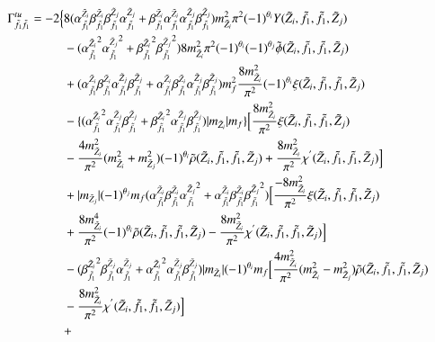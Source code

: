 \documentclass[final,3p,times,pdflatex]{elsarticle}
\begin{document}
\begin{equation}
\begin{aligned}
\Gamma_{\tilde{f}_1 \tilde{f}_1}^{tu} =  -2\Big\{&8({\alpha_{\tilde{f}_1}^{\tilde{Z}_i}}{\beta_{\tilde{f}_1}^{\tilde{Z}_i}}{\beta_{\tilde{f}_1}^{\tilde{Z}_j}}{\alpha_{\tilde{f}_1}^{\tilde{Z}_j}} + {\beta_{\tilde{f}_1}^{\tilde{Z}_i}}{\alpha_{\tilde{f}_1}^{\tilde{Z}_i}}{\alpha_{\tilde{f}_1}^{\tilde{Z}_j}} {\beta_{\tilde{f}_1}^{\tilde{Z}_j}}){m_{\tilde{Z}_i}^2 \pi^2}(-1)^{\theta_i}Y(\tilde{Z}_i,\tilde{f}_1, \tilde{f}_1, \tilde{Z}_j) \\ & -({\alpha_{\tilde{f}_1}^{\tilde{Z}_i}}^2 {\alpha_{\tilde{f}_1}^{\tilde{Z}_j}}^2 + {\beta_{\tilde{f}_1}^{\tilde{Z}_i}}^2 {\beta_{\tilde{f}_1}^{\tilde{Z}_j}}^2){8 m_{\tilde{Z}_i}^2 \pi^2} (-1)^{\theta_i}(-1)^{\theta_j} \tilde{\phi}(\tilde{Z}_i, \tilde{f}_1, \tilde{f}_1, \tilde{Z}_j) \\ & + ( {\alpha_{\tilde{f}_1}^{\tilde{Z}_i}}{\beta_{\tilde{f}_1}^{\tilde{Z}_i}}{\alpha_{\tilde{f}_1}^{\tilde{Z}_j}}{\beta_{\tilde{f}_1}^{\tilde{Z}_j}}+ {\alpha_{\tilde{f}_1}^{\tilde{Z}_i}}{\beta_{\tilde{f}_1}^{\tilde{Z}_i}} {\alpha_{\tilde{f}_1}^{\tilde{Z}_j}}{\beta_{\tilde{f}_1}^{\tilde{Z}_j}})m_{f}^2 {8 m_{\tilde{Z}_i}^2 \over \pi^2} (-1)^{\theta_i} \xi (\tilde{Z}_i,\tilde{f}_1, \tilde{f}_1, \tilde{Z}_j) \\ & -\{({\alpha_{\tilde{f}_1}^{\tilde{Z}_i}}^2 {\alpha_{\tilde{f}_1}^{\tilde{Z}_j}} {\beta_{\tilde{f}_1}^{\tilde{Z}_j}} + {\beta_{\tilde{f}_1}^{\tilde{Z}_i}}^2 {\alpha_{\tilde{f}_1}^{\tilde{Z}_j}} {\beta_{\tilde{f}_1}^{\tilde{Z}_j}})|m_{\tilde{Z}_i}|m_{f}\}\Big[{8 m_{\tilde{Z}_i}^2 \over \pi^2}\xi(\tilde{Z}_i, \tilde{f}_1, \tilde{f}_1, \tilde{Z}_j) \\ & - {4m_{\tilde{Z}_i}^2 \over \pi^2}(m_{\tilde{Z}_i}^2 + m_{\tilde{Z}_j}^2)(-1)^{\theta_i}\tilde{\rho}(\tilde{Z}_i,\tilde{f}_1,\tilde{f}_1,\tilde{Z}_j) + {8m_{\tilde{Z}_i}^2 \over \pi^2} \chi^{'} (\tilde{Z}_i,\tilde{f}_1,\tilde{f}_1,\tilde{Z}_j)\Big] \\ & + |m_{\tilde{Z}_j}|(-1)^{\theta_j}m_{f}({\alpha_{\tilde{f}_1}^{\tilde{Z}_i}}{\beta_{\tilde{f}_1}^{\tilde{Z}_i}}{\alpha_{\tilde{f}_1}^{\tilde{Z}_j}}^2 + {\alpha_{\tilde{f}_1}^{\tilde{Z}_i}} {\beta_{\tilde{f}_1}^{\tilde{Z}_i}}{\beta_{\tilde{f}_1}^{\tilde{Z}_j}}^2)\Big[{-8m_{\tilde{Z}_i}^2 \over \pi^2}\xi(\tilde{Z}_i,\tilde{f}_1,\tilde{f}_1,\tilde{Z}_j) \\ & + {8 m_{\tilde{Z}_i}^4 \over \pi^2}(-1)^{\theta_i}\tilde{\rho}(\tilde{Z}_i,\tilde{f}_1,\tilde{f}_1,\tilde{Z}_j) - {8 m_{\tilde{Z}_i}^2 \over \pi^2}\chi^{'}(\tilde{Z}_i,\tilde{f}_1,\tilde{f}_1,\tilde{Z}_j)\Big] \\ & - ({\beta_{\tilde{f}_1}^{\tilde{Z}_i}}^2{\beta_{\tilde{f}_1}^{\tilde{Z}_j}}{\alpha_{\tilde{f}_1}^{\tilde{Z}_j}} + {\alpha_{\tilde{f}_1}^{\tilde{Z}_i}}^2{\alpha_{\tilde{f}_1}^{\tilde{Z}_j}} {\beta_{\tilde{f}_1}^{\tilde{Z}_j}})|m_{\tilde{Z}_i}|(-1)^{\theta_i}m_{f}\Big[{4m_{\tilde{Z}_i}^2 \over \pi^2}(m_{\tilde{Z}_i}^2 - m_{\tilde{Z}_j}^2)\tilde{\rho}(\tilde{Z}_i,\tilde{f}_1,\tilde{f}_1,\tilde{Z}_j) \\ & - {8m_{\tilde{Z}_i}^2 \over \pi^2} \chi^{'}(\tilde{Z}_i,\tilde{f}_1,\tilde{f}_1,\tilde{Z}_j)\Big] \\ & + 
\end{aligned}
\end{equation}
\end{document}
